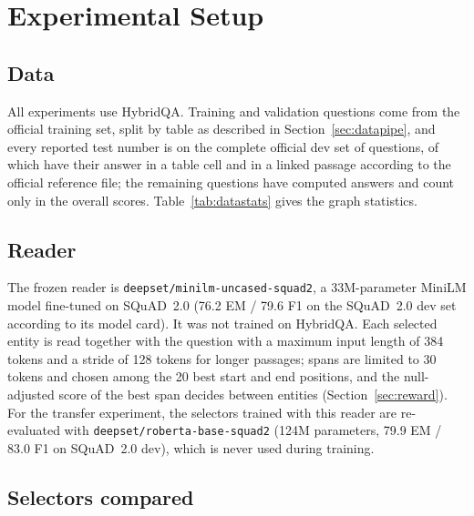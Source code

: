 \chapter{Experimental Setup}
\label{ch:setup}

\section{Data}

All experiments use HybridQA. Training and validation questions come from the official training set, split by table as described in Section~\ref{sec:datapipe}, and every reported test number is on the complete official dev set of \nTest{} questions, of which \nTestTypeTable{} have their answer in a table cell and \nTestTypePassage{} in a linked passage according to the official reference file; the remaining questions have computed answers and count only in the overall scores. Table~\ref{tab:datastats} gives the graph statistics. 

\section{Reader}
\label{sec:setup-reader}

The frozen reader is \texttt{deepset/minilm-uncased-squad2}, a 33M-parameter MiniLM model fine-tuned on SQuAD~2.0 (76.2 EM / 79.6 F1 on the SQuAD~2.0 dev set according to its model card). It was not trained on HybridQA. Each selected entity is read together with the question with a maximum input length of 384 tokens and a stride of 128 tokens for longer passages; spans are limited to 30 tokens and chosen among the 20 best start and end positions, and the null-adjusted score of the best span decides between entities (Section~\ref{sec:reward}).  For the transfer experiment, the selectors trained with this reader are re-evaluated with \texttt{deepset/roberta-base-squad2} (124M parameters, 79.9 EM / 83.0 F1 on SQuAD~2.0 dev), which is never used during training.

\section{Selectors compared}

